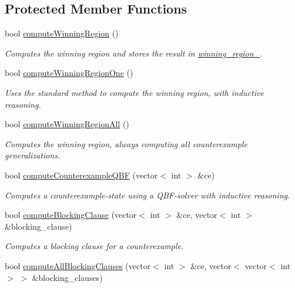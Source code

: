 \subsection*{Protected Member Functions}
\begin{DoxyCompactItemize}
\item 
bool \hyperlink{classLearnSynthQBFInd_a41593ccf692af8948f4b1255fb13ffe5}{compute\-Winning\-Region} ()
\begin{DoxyCompactList}\small\item\em Computes the winning region and stores the result in \hyperlink{classLearnSynthQBFInd_ab8ce6031137413e90e0626bbdc734be0}{winning\-\_\-region\-\_\-}. \end{DoxyCompactList}\item 
bool \hyperlink{classLearnSynthQBFInd_a9a48eb17721b9c941689795e0913dc0b}{compute\-Winning\-Region\-One} ()
\begin{DoxyCompactList}\small\item\em Uses the standard method to compute the winning region, with inductive reasoning. \end{DoxyCompactList}\item 
bool \hyperlink{classLearnSynthQBFInd_a1665e16ff8fa78f696b1e3373db96edb}{compute\-Winning\-Region\-All} ()
\begin{DoxyCompactList}\small\item\em Computes the winning region, always computing all counterexample generalizations. \end{DoxyCompactList}\item 
bool \hyperlink{classLearnSynthQBFInd_a1a771069bb5352236c509593e8f18426}{compute\-Counterexample\-Q\-B\-F} (vector$<$ int $>$ \&ce)
\begin{DoxyCompactList}\small\item\em Computes a counterexample-\/state using a Q\-B\-F-\/solver with inductive reasoning. \end{DoxyCompactList}\item 
bool \hyperlink{classLearnSynthQBFInd_a0ddc68117f68cecdfd09231562f981c7}{compute\-Blocking\-Clause} (vector$<$ int $>$ \&ce, vector$<$ int $>$ \&blocking\-\_\-clause)
\begin{DoxyCompactList}\small\item\em Computes a blocking clause for a counterexample. \end{DoxyCompactList}\item 
bool \hyperlink{classLearnSynthQBFInd_a22e56037bf21941a2a2510eabd97b279}{compute\-All\-Blocking\-Clauses} (vector$<$ int $>$ \&ce, vector$<$ vector$<$ int $>$ $>$ \&blocking\-\_\-clauses)

\end{DoxyCompactItemize}
